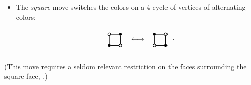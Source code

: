 \begin{definition}
\begin{itemize}
\[\begin{picture}
\put(20,12.5){\line(0,1){15}}
\put(20,10){\circle{5}}
\put(20,30){\circle{5}}
\end{picture}
\begin{picture}(40,40)(0,0)
\thicklines
\put(20,20){\makebox(0,0){$\longleftrightarrow$}}
\end{picture}
\begin{picture}(40,40)(0,0)
\thicklines
\put(0,0){\line(1,2){9}}
\put(40,40){\line(-1,-2){9}}
\put(40,0){\line(-1,2){9}}
\put(0,40){\line(1,-2){9}}
\put(12.5,20){\line(1,0){15}}
\put(10,20){\circle{5}}
\put(30,20){\circle{5}}
\put(42,20){.}
\end{picture}
\]

\item The \emph{square} move switches the colors on a 4-cycle of
 vertices of alternating colors:
\[
\setlength{\unitlength}{0.8pt}
\begin{picture}(40,45)(0,0)
\thicklines
\put(0,0){\line(1,1){8.5}}
\put(40,40){\line(-1,-1){8.5}}
\put(0,40){\line(1,-1){8.5}}
\put(40,0){\line(-1,1){8.5}}
\put(10,12.5){\line(0,1){15}}
\put(30,12.5){\line(0,1){15}}
\put(12.5,10){\line(1,0){15}}
\put(12.5,30){\line(1,0){15}}
\put(10,10){\circle*{5}}
\put(10,30){\circle{5}}
\put(30,10){\circle{5}}
\put(30,30){\circle*{5}}
\end{picture}
\begin{picture}(40,40)(0,0)
\thicklines
\put(20,20){\makebox(0,0){$\longleftrightarrow$}}
\end{picture}
\begin{picture}(40,40)(0,0)
\thicklines
\put(0,0){\line(1,1){8.5}}
\put(40,40){\line(-1,-1){8.5}}
\put(0,40){\line(1,-1){8.5}}
\put(40,0){\line(-1,1){8.5}}
\put(10,12.5){\line(0,1){15}}
\put(30,12.5){\line(0,1){15}}
\put(12.5,10){\line(1,0){15}}
\put(12.5,30){\line(1,0){15}}
\put(10,10){\circle{5}}
\put(10,30){\circle*{5}}
\put(30,10){\circle*{5}}
\put(30,30){\circle{5}}
\put(42,20){.}
\end{picture}
\]
\end{itemize}
(This move requires a seldom relevant restriction on the faces surrounding the square face, 
\cf \cite[Restriction~6.3]{FPST}.) 
\end{definition}


